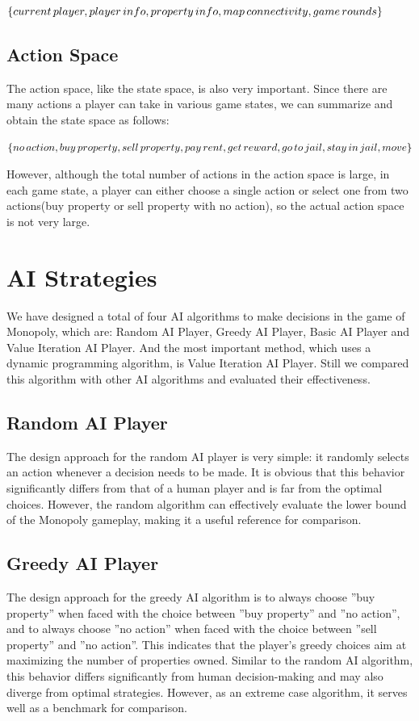\documentclass{article}
\begin{document}
    $\{current\thinspace player, player\thinspace info, property\thinspace info, map\thinspace connectivity, game\thinspace rounds\}$
    
    \subsection{Action Space}
    The action space, like the state space, is also very important. Since there are many actions a player can take in various game states, we can summarize and obtain the state space as follows:
    
    $\{no\thinspace action, buy\thinspace property, sell\thinspace property, pay\thinspace rent, get\thinspace reward, go\thinspace to\thinspace jail, stay\thinspace in\thinspace jail, move\}$

    However, although the total number of actions in the action space is large, in each game state, a player can either choose a single action or select one from two actions(buy property or sell property with no action), so the actual action space is not very large.
    
\section{AI Strategies}
We have designed a total of four AI algorithms to make decisions in the game of Monopoly, which are: Random AI Player, Greedy AI Player, Basic AI Player and Value Iteration AI Player. And the most important method, which uses a dynamic programming algorithm, is Value Iteration AI Player. Still we compared this algorithm with other AI algorithms and evaluated their effectiveness.

\subsection{Random AI Player}
The design approach for the random AI player is very simple: it randomly selects an action whenever a decision needs to be made. It is obvious that this behavior significantly differs from that of a human player and is far from the optimal choices. However, the random algorithm can effectively evaluate the lower bound of the Monopoly gameplay, making it a useful reference for comparison.

\subsection{Greedy AI Player}
The design approach for the greedy AI algorithm is to always choose ''buy property'' when faced with the choice between ''buy property'' and ''no action'', and to always choose ''no action'' when faced with the choice between ''sell property'' and ''no action''. This indicates that the player's greedy choices aim at maximizing the number of properties owned. Similar to the random AI algorithm, this behavior differs significantly from human decision-making and may also diverge from optimal strategies. However, as an extreme case algorithm, it serves well as a benchmark for comparison.
\end{document}

